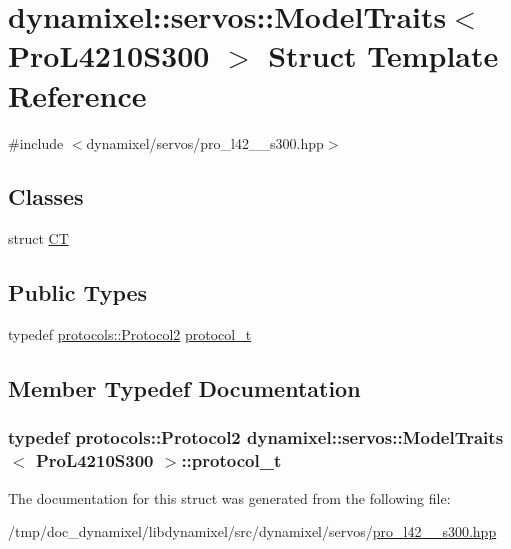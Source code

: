 \hypertarget{structdynamixel_1_1servos_1_1_model_traits_3_01_pro_l4210_s300_01_4}{}\section{dynamixel\+:\+:servos\+:\+:Model\+Traits$<$ Pro\+L4210\+S300 $>$ Struct Template Reference}
\label{structdynamixel_1_1servos_1_1_model_traits_3_01_pro_l4210_s300_01_4}


{\ttfamily \#include $<$dynamixel/servos/pro\+\_\+l42\+\_\+\_\+s300.\+hpp$>$}

\subsection*{Classes}
\begin{DoxyCompactItemize}
\item 
struct \hyperlink{structdynamixel_1_1servos_1_1_model_traits_3_01_pro_l4210_s300_01_4_1_1_c_t}{C\+T}
\end{DoxyCompactItemize}
\subsection*{Public Types}
\begin{DoxyCompactItemize}
\item 
typedef \hyperlink{classdynamixel_1_1protocols_1_1_protocol2}{protocols\+::\+Protocol2} \hyperlink{structdynamixel_1_1servos_1_1_model_traits_3_01_pro_l4210_s300_01_4_add139e0a0dc53ef8abea510189b32740}{protocol\+\_\+t}
\end{DoxyCompactItemize}


\subsection{Member Typedef Documentation}
\hypertarget{structdynamixel_1_1servos_1_1_model_traits_3_01_pro_l4210_s300_01_4_add139e0a0dc53ef8abea510189b32740}{}
\subsubsection[{protocol\+\_\+t}]{\setlength{\rightskip}{0pt plus 5cm}typedef {\bf protocols\+::\+Protocol2} {\bf dynamixel\+::servos\+::\+Model\+Traits}$<$ {\bf Pro\+L4210\+S300} $>$\+::{\bf protocol\+\_\+t}}\label{structdynamixel_1_1servos_1_1_model_traits_3_01_pro_l4210_s300_01_4_add139e0a0dc53ef8abea510189b32740}


The documentation for this struct was generated from the following file\+:\begin{DoxyCompactItemize}
\item 
/tmp/doc\+\_\+dynamixel/libdynamixel/src/dynamixel/servos/\hyperlink{pro__l42__10__s300_8hpp}{pro\+\_\+l42\+\_\+\_\+s300.\+hpp}\end{DoxyCompactItemize}
